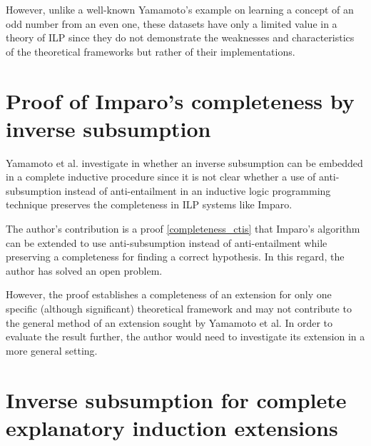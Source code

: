 However, unlike a well-known Yamamoto's example \cite{yamamoto1997hypotheses} on learning a concept of an odd number from an even one, these datasets have only a limited value in a theory of ILP since they do not demonstrate the weaknesses and characteristics of the theoretical frameworks but rather of their implementations. 

\section{Proof of Imparo's completeness by inverse subsumption}
Yamamoto et al. investigate in \cite{yamamoto2012inverse} whether an inverse subsumption can be embedded in a complete inductive procedure since it is not clear whether a use of anti-subsumption instead of anti-entailment in an inductive logic programming technique preserves the completeness in ILP systems like Imparo.

The author's contribution is a proof \ref{completeness_ctis} that Imparo's algorithm can be extended to use anti-subsumption instead of anti-entailment while preserving a completeness for finding a correct hypothesis. In this regard, the author has solved an open problem.

However, the proof establishes a completeness of an extension for only one specific (although significant) theoretical framework and may not contribute to the general method of an extension sought by Yamamoto et al. In order to evaluate the result further, the author would need to investigate its extension in a more general setting.

\section{Inverse subsumption for complete explanatory induction extensions}
